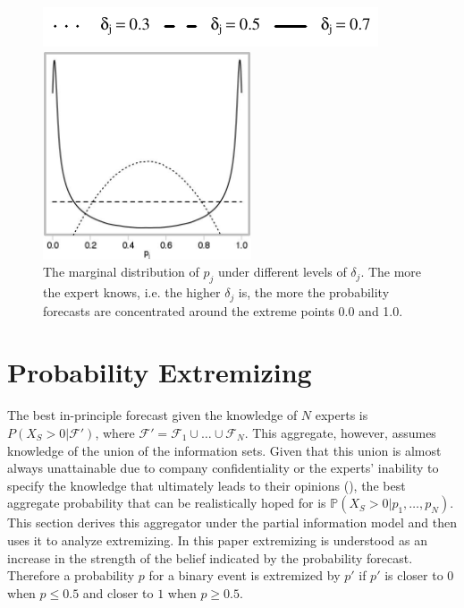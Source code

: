 \documentclass[11pt]{article}
\renewcommand{\P}{\mathbb{P}}
\theoremstyle{definition}
\theoremstyle{definition}
\begin{document}
\begin{figure}[t]
\centering
	\hspace{0em}\includegraphics{LegendMarginal}

 \includegraphics[width= 0.55\textwidth]{Marginals}
   \caption{The marginal distribution of $p_j$ under different levels of $\delta_j$. The more the expert knows, i.e. the higher $\delta_j$ is, the more the probability forecasts are concentrated around the extreme points 0.0 and 1.0.}
\label{marginals}
\end{figure}


\section{Probability Extremizing}
\label{extremizing}
The best in-principle forecast given the knowledge of $N$ experts is $P(X_{S} > 0 |  \mathcal{F}')$, where $\mathcal{F}' = \mathcal{F}_1 \cup \dots \cup \mathcal{F}_N$. This aggregate, however, assumes knowledge of the union of the information sets. Given that this union is almost always unattainable due to company confidentiality or the experts' inability to specify the knowledge that ultimately leads to their opinions (\cite{dawid1995coherent}), the best aggregate probability that can be realistically hoped for is  $\P(X_{S} > 0 | p_1, \dots, p_N)$. This section derives this aggregator under the partial information model and then uses it to analyze extremizing.  In this paper extremizing is understood as an increase in the strength of the belief indicated by the probability forecast. Therefore a probability $p$ for a binary event is extremized by $p'$ if $p'$ is closer to $0$ when $p \leq 0.5$ and closer to $1$ when $p \geq 0.5$.  
\end{document}
